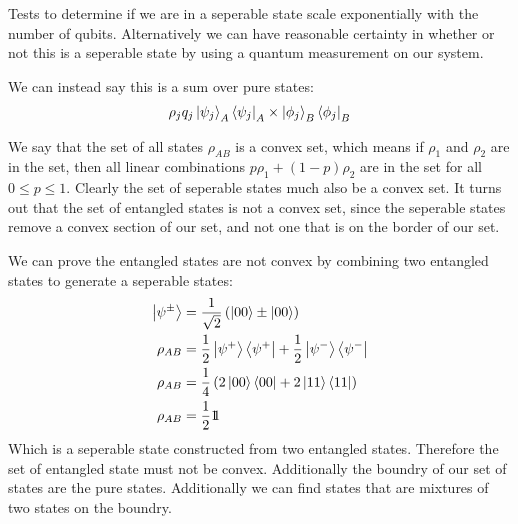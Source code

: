 Tests to determine if we are in a seperable state scale exponentially with the number of qubits. Alternatively we can have reasonable certainty in whether or not this is a seperable state by using a quantum measurement on our system.

We can instead say this is a sum over pure states:
\begin{align*}
	\rho_j q_j \ket{\psi_j}_A\bra{\psi_j}_A \times \ket{\phi_j}_B\bra{\phi_j}_B
\end{align*}

We say that the set of all states $\rho_{AB}$ is a convex set, which means if $\rho_1$ and $\rho_2$ are in the set, then all linear combinations $p\rho_1 + (1-p)\rho_2$ are in the set for all $0\leq p \leq 1$.
Clearly the set of seperable states much also be a convex set. It turns out that the set of entangled states is not a convex set, since the seperable states remove a convex section of our set, and not one that is on the border of our set.

We can prove the entangled states are not convex by combining two entangled states to generate a seperable states:
\begin{align*}
	\ket{\psi^\pm} &= \frac{1}{\sqrt{2}}\left(\ket{00} \pm \ket{00}\right) \\
	\rho_{AB} &= \frac{1}{2} \ket{\psi^+}\bra{\psi^+} +\frac{1}{2} \ket{\psi^-}\bra{\psi^-} \\
	\rho_{AB} &= \frac{1}{4}\left(2\ket{00}\bra{00} + 2\ket{11}\bra{11}\right) \\
	\rho_{AB} &= \frac{1}{2} 1\!\!1
\end{align*}
Which is a seperable state constructed from two entangled states. Therefore the set of entangled state must not be convex. Additionally the boundry of our set of states are the pure states. Additionally we can find states that are mixtures of two states on the boundry.
